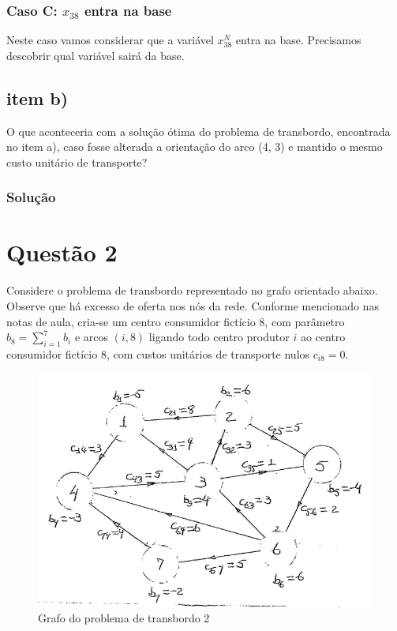 \documentclass{article}
\begin{document}
\subsubsection{Caso C: $x_{38}$ entra na base}

Neste caso vamos considerar que a variável $x^{N}_{38}$ entra na base.
Precisamos descobrir qual variável sairá da base.

\subsection{item b)}

O que aconteceria com a solução ótima do problema de transbordo, encontrada no item a), caso fosse alterada a orientação do arco (4, 3) e mantido o mesmo custo unitário de transporte?


\subsubsection{Solução}



\section{Questão 2}

Considere o problema de transbordo representado no grafo orientado abaixo.
Observe que há excesso de oferta nos nós da rede.
Conforme mencionado nas notas de aula, cria-se um centro consumidor fictício 8, com parâmetro $b_{8} = \sum_{i=1}^{7} b_{i}$ e arcos $(i, 8)$ ligando todo centro produtor $i$ ao centro consumidor fictício 8, com custos unitários de transporte nulos $c_{i8} = 0$.

\begin{figure}[H]
    \centering
    \includegraphics[scale=0.5]{images/q2-enunciado.png}
    \caption{Grafo do problema de transbordo 2}
\end{figure}
\end{document}
